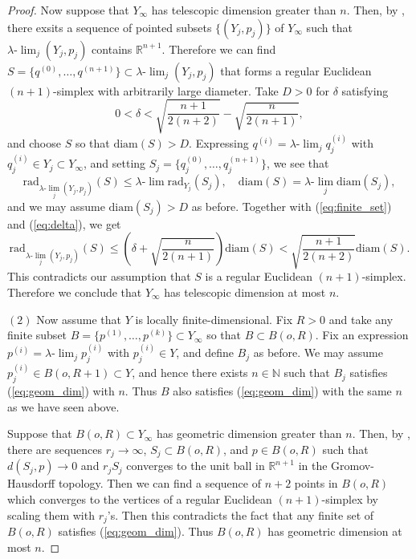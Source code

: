 \documentclass[12pt]{amsart}
\numberwithin{equation}{section}
\theoremstyle{plain}
\theoremstyle{definition}
\theoremstyle{remark}
\newcommand{\R}{{\mathbb R}}
\newcommand{\N}{{\mathbb N}}
\newcommand{\diam}[1]{\mathrm{diam}(#1)}
\newcommand{\rad}[2]{\mathrm{rad}_{#1}({#2})}
\newcommand{\ulim}{\lambda{\text{-}}\!\lim}
\begin{document}
\begin{proof}
 Now suppose that $Y_{\infty}$ has telescopic
 dimension greater than $n$.  Then, by \cite[Theorem 7.1]{kleiner},
 there exsits a sequence of pointed subsets $\{(Y_j, p_j)\}$ of
 $Y_{\infty}$ such that $\ulim_j (Y_j,p_j)$ contains $\R^{n+1}$.  
 Therefore we can find 
 $S=\{q^{(0)}, \dots, q^{(n+1)}\}\subset \ulim_j (Y_j,p_j)$ that forms a
 regular Euclidean $(n+1)$-simplex with arbitrarily large diameter. 
 Take $D>0$ for $\delta$  satisfying
\begin{equation}
\label{eq:delta}
 0< \delta < \sqrt{\frac{n+1}{2(n+2)}} - \sqrt{\frac{n}{2(n+1)}}, 
\end{equation}
 and choose $S$ so that $\diam{S}>D$. 
 Expressing $q^{(i)}=\ulim_j q^{(i)}_j$ 
 with $q^{(i)}_j \in Y_j \subset Y_{\infty}$, and setting 
 $S_j=\{q^{(0)}_j, \dots, q^{(n+1)}_j\}$, we see that 
\begin{equation*}
 \rad{\ulim_j(Y_j,p_j)}{S}\leq \ulim \rad{Y_j}{S_j},
  \quad
 \diam{S} = \ulim_j \diam{S_j}, 
\end{equation*}
 and we may assume $\diam{S_j}>D$ as before.  
 Together with (\ref{eq:finite_set}) and (\ref{eq:delta}), we get 
\begin{equation*}
 \rad{\ulim_j (Y_j,p_j)}{S} 
  \leq \left( \delta + \sqrt{\frac{n}{2(n+1)}}\right) \diam{S}
  < \sqrt{\frac{n+1}{2(n+2)}} \diam{S}.   
\end{equation*}
 This contradicts our assumption that $S$ is a regular Euclidean
 $(n+1)$-simplex. 
 Therefore we conclude that $Y_{\infty}$ has telescopic
 dimension at most $n$. 

\medskip

 $(2)$ Now assume that $Y$ is locally finite-dimensional. 
 Fix $R>0$ and take any finite subset 
 $B=\{p^{(1)}, \dots, p^{(k)}\} \subset Y_{\infty}$ so
 that $B \subset B(o,R)$.  
 Fix an expression $p^{(i)}=\ulim_j p^{(i)}_j$ with $p^{(i)}_j \in Y$,  
 and define $B_j$ as before. 
 We may assume $p^{(i)}_j \in B(o, R+1) \subset Y$, and hence
 there exists $n \in \N$ such that $B_j$ satisfies (\ref{eq:geom_dim})
 with $n$. Thus $B$ also satisfies (\ref{eq:geom_dim}) with the same
 $n$ as we have seen above. 

 Suppose that $B(o,R)\subset Y_{\infty}$ has geometric dimension greater
 than $n$. 
 Then, by \cite[Theorem A]{kleiner}, there are sequences 
 $r_j \to \infty$, $S_j \subset B(o,R)$, and $p \in B(o,R)$ such that
 $d(S_j,p)\to 0$ and $r_j S_j$ converges to the unit ball in $\R^{n+1}$
 in the Gromov-Hausdorff topology.  
 Then we can find a sequence of $n+2$ points in $B(o,R)$ which converges
 to the vertices of a regular Euclidean $(n+1)$-simplex by scaling them
 with $r_j$'s.  
 Then this contradicts the fact that any finite set of
 $B(o,R)$ satisfies (\ref{eq:geom_dim}). Thus $B(o,R)$ has
 geometric dimension at most $n$. 
\end{proof}
\end{document}
